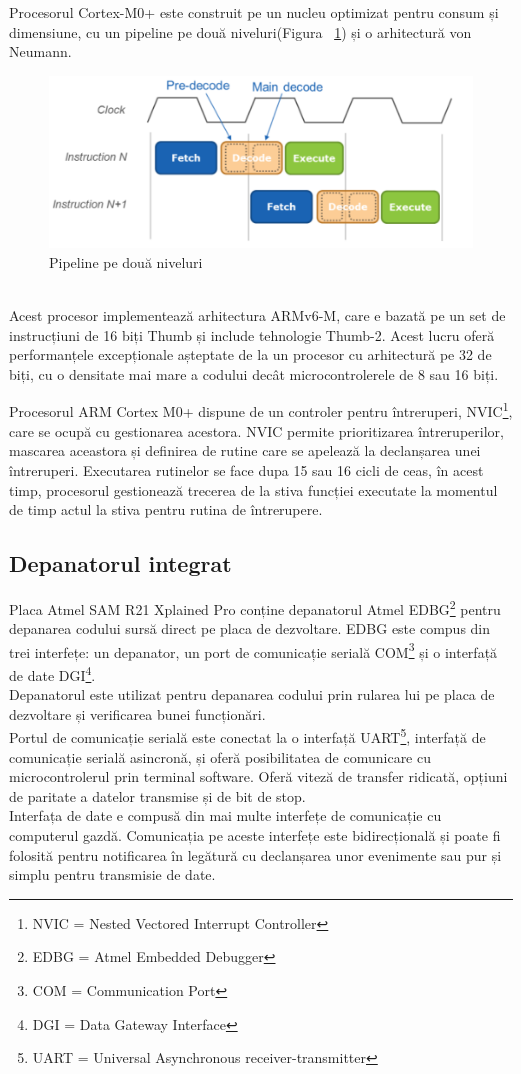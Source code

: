 \documentclass[12pt,a4paper]{report}
\begin{document}
Procesorul Cortex-M0+ este construit pe un nucleu optimizat pentru consum și dimensiune, cu un pipeline pe două niveluri(Figura ~\ref{fig:pipeline}) și o arhitectură von Neumann.
\begin{figure}[bh]
\centering
\includegraphics[scale=0.7]{pics/pipeline.png}
  \caption{Pipeline pe două niveluri\cite{pipeline}}
  \label{fig:pipeline}
\end{figure} \\
Acest procesor implementează arhitectura ARMv6-M, care e bazată pe un set de instrucțiuni de 16 biți Thumb și include tehnologie Thumb-2. Acest lucru oferă performanțele excepționale așteptate de la un procesor cu arhitectură pe 32 de biți, cu o densitate mai mare a codului decât microcontrolerele de 8 sau 16 biți.

Procesorul ARM Cortex M0+ dispune de un controler pentru întreruperi, NVIC\footnote{NVIC = Nested Vectored Interrupt Controller}, care se ocupă cu gestionarea acestora. NVIC permite prioritizarea întreruperilor, mascarea aceastora și definirea de rutine care se apelează la declanșarea unei întreruperi. Executarea rutinelor se face dupa 15 sau 16 cicli de ceas, în acest timp, procesorul gestionează trecerea de la stiva funcției executate la momentul de timp actul la stiva pentru rutina de întrerupere.

\subsection{Depanatorul integrat}
Placa Atmel SAM R21 Xplained Pro conține depanatorul Atmel EDBG\footnote{EDBG = Atmel Embedded Debugger} pentru depanarea codului sursă direct pe placa de dezvoltare. EDBG este compus din trei interfețe: un depanator, un port de comunicație serială COM\footnote{COM = Communication Port} și o interfață de date DGI\footnote{DGI = Data Gateway Interface}.\\
Depanatorul este utilizat pentru depanarea codului prin rularea lui pe placa de dezvoltare și verificarea bunei funcționări.\\
Portul de comunicație serială este conectat la o interfață UART\footnote{UART = Universal Asynchronous receiver-transmitter}, interfață de comunicație serială asincronă, și oferă posibilitatea de comunicare cu microcontrolerul prin terminal software. Oferă viteză de transfer ridicată, opțiuni de paritate a datelor transmise și de bit de stop.\\
Interfața de date e compusă din mai multe interfețe de comunicație cu computerul gazdă. Comunicația pe aceste interfețe este bidirecțională și poate fi folosită pentru notificarea în legătură cu declanșarea unor evenimente sau pur și simplu pentru transmisie de date.
\end{document}
